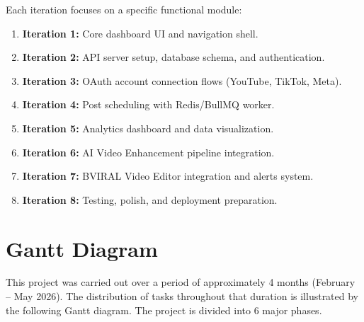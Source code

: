 Each iteration focuses on a specific functional module:
\begin{enumerate}
    \item \textbf{Iteration 1:} Core dashboard UI and navigation shell.
    \item \textbf{Iteration 2:} API server setup, database schema, and authentication.
    \item \textbf{Iteration 3:} OAuth account connection flows (YouTube, TikTok, Meta).
    \item \textbf{Iteration 4:} Post scheduling with Redis/BullMQ worker.
    \item \textbf{Iteration 5:} Analytics dashboard and data visualization.
    \item \textbf{Iteration 6:} AI Video Enhancement pipeline integration.
    \item \textbf{Iteration 7:} BVIRAL Video Editor integration and alerts system.
    \item \textbf{Iteration 8:} Testing, polish, and deployment preparation.
\end{enumerate}

\section{Gantt Diagram}

This project was carried out over a period of approximately 4 months (February -- May 2026). The distribution of tasks throughout that duration is illustrated by the following Gantt diagram. The project is divided into 6 major phases.



